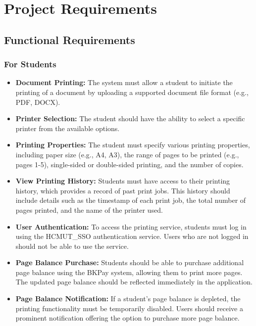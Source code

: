 \section{Project Requirements}

\subsection{Functional Requirements}

\subsubsection{For Students}
\begin{itemize}
\item \textbf{Document Printing:} The system must allow a student to initiate the printing of a document by uploading a supported document file format (e.g., PDF, DOCX).
\item \textbf{Printer Selection:} The student should have the ability to select a specific printer from the available options.
\item \textbf{Printing Properties:} The student must specify various printing properties, including paper size (e.g., A4, A3), the range of pages to be printed (e.g., pages 1-5), single-sided or double-sided printing, and the number of copies.
\item \textbf{View Printing History:} Students must have access to their printing history, which provides a record of past print jobs. This history should include details such as the timestamp of each print job, the total number of pages printed, and the name of the printer used.
\item \textbf{User Authentication:} To access the printing service, students must log in using the HCMUT\_SSO authentication service. Users who are not logged in should not be able to use the service.
\item \textbf{Page Balance Purchase:} Students should be able to purchase additional page balance using the BKPay system, allowing them to print more pages. The updated page balance should be reflected immediately in the application.
\item \textbf{Page Balance Notification:} If a student's page balance is depleted, the printing functionality must be temporarily disabled. Users should receive a prominent notification offering the option to purchase more page balance.
\end{itemize}


